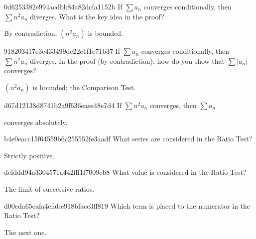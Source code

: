 \begin{note}{0d6253382e994acdbb84a82dcfa1152b}
    If \({ \sum a_n }\) converges conditionally, then \({ \sum n^2 a_n }\) diverges.
    What is the key idea in the proof?

    \begin{cloze}{1}
        By contradiction; \({ (n^2 a_n) }\) is bounded.
    \end{cloze}
\end{note}

\begin{note}{918203417e3c433499de22e1f1e71b37}
    If \({ \sum a_n }\) converges conditionally, then \({ \sum n^2 a_n }\) diverges.
    In the proof (by contradiction), how do you show that \({ \sum \left\lvert a_n \right\rvert }\) converges?

    \begin{cloze}{1}
        \({ (n^2 a_n) }\) is bounded; the Comparison Test.
    \end{cloze}
\end{note}

\begin{note}{d67d12138d8741b2a9f636eaee48e7d4}
    If \({ \sum n^2 a_n }\) converges, then \({ \sum a_n }\) \begin{icloze}{1}converges absolutely.\end{icloze}
\end{note}

\begin{note}{b4e0eacc15f64559b6c255552fe3aadf}
    What series are considered in the Ratio Test?

    \begin{cloze}{1}
        Strictly positive.
    \end{cloze}
\end{note}

\begin{note}{dcfddd94a3304571a442fff1f7009cb8}
    What value is considered in the Ratio Test?

    \begin{cloze}{1}
        The limit of successive ratios.
    \end{cloze}
\end{note}

\begin{note}{d00eda65eafa4efabe918bfacc3ff819}
    Which term is placed to the numerator in the Ratio Test?

    \begin{cloze}{1}
        The next one.
    \end{cloze}
\end{note}

